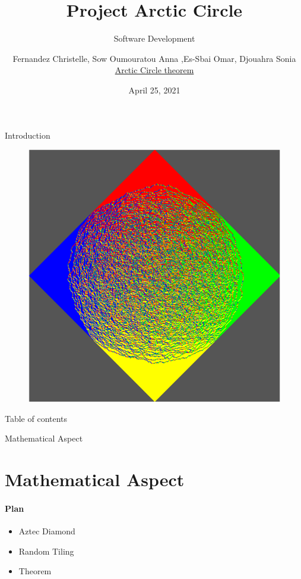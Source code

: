 \documentclass [xcolor=svgnames, t] {beamer}
\title[Project Arctic Circle]{Project Arctic Circle}
\subtitle{Software Development}
\author[A.SOW,C.FERNANDEZ, O.ESSBAI,S.DJOUAHRA]{{Fernandez Christelle, Sow Oumouratou Anna
,Es-Sbai Omar, Djouahra Sonia } \\
\faGithub\href{https://github.com/ChristelleFDZ/projectarcticcircletheorem/}{ Arctic Circle theorem} }
\institute[]{Masters MIND-Biostatistic, Montpellier University}
\date{April 25, 2021}
\begin{document}
\begin{frame}
 \titlepage   
\end{frame}

\begin{frame}{Introduction}
\begin{figure}[t]
\includegraphics[scale=0.5]{aztecdiamond.png}
\centering
\end{figure}
\end{frame}

\begin{frame}{Table of contents}
\tableofcontents
\end{frame}





 
 
\begin{frame}{Mathematical Aspect}
\section{Mathematical Aspect}
\framesubtitle{Plan}
 \begin{itemize}
  \item  Aztec Diamond
     \item Random Tiling
     \item Theorem
 \end{itemize}

 \end{frame}
 
\end{document}
